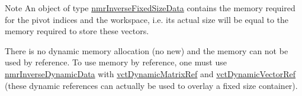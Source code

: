 \begin{DoxyNote}{Note}
An object of type \hyperlink{classnmr_inverse_fixed_size_data}{nmr\-Inverse\-Fixed\-Size\-Data} contains the memory required for the pivot indices and the workspace, i.\-e. its actual size will be equal to the memory required to store these vectors.

There is no dynamic memory allocation (no {\ttfamily new}) and the memory can not be used by reference. To use memory by reference, one must use \hyperlink{classnmr_inverse_dynamic_data}{nmr\-Inverse\-Dynamic\-Data} with \hyperlink{classvct_dynamic_matrix_ref}{vct\-Dynamic\-Matrix\-Ref} and \hyperlink{classvct_dynamic_vector_ref}{vct\-Dynamic\-Vector\-Ref} (these dynamic references can actually be used to overlay a fixed size container). 
\end{DoxyNote}


